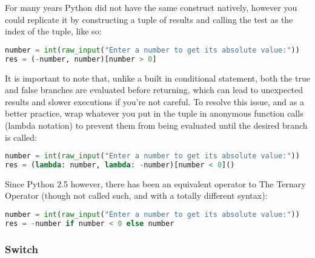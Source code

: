 For many years Python did not have the same construct natively, however you
could replicate it by constructing a tuple of results and calling the test as
the index of the tuple, like so:
\lstset{basicstyle=\scriptsize, numbers=left, captionpos=b, tabsize=4}
\begin{lstlisting}[caption=Ternary Operator 1,language={Python},
xleftmargin=15pt, label=lst:ternaryoperator1]
number = int(raw_input("Enter a number to get its absolute value:"))
res = (-number, number)[number > 0]
\end{lstlisting}

It is important to note that, unlike a built in conditional statement, both the
true and false branches are evaluated before returning, which can lead to
unexpected results and slower executions if you're not careful. To resolve this
issue, and as a better practice, wrap whatever you put in the tuple in anonymous
function calls (lambda notation) to prevent them from being evaluated until the
desired branch is called:
\lstset{basicstyle=\scriptsize, numbers=left, captionpos=b, tabsize=4}
\begin{lstlisting}[caption=Ternary Operator Lambda,language={Python},
xleftmargin=15pt, label=lst:ternaryoperatorlambda]
number = int(raw_input("Enter a number to get its absolute value:"))
res = (lambda: number, lambda: -number)[number < 0]()
\end{lstlisting}

Since Python 2.5 however, there has been an equivalent operator to The Ternary
Operator (though not called such, and with a totally different syntax):
\lstset{basicstyle=\scriptsize, numbers=left, captionpos=b, tabsize=4}
\begin{lstlisting}[caption=Ternary Operator Python,language={Python},
xleftmargin=15pt, label=lst:ternaryoperatorpython]
number = int(raw_input("Enter a number to get its absolute value:"))
res = -number if number < 0 else number
\end{lstlisting}

\subsubsection{Switch}

